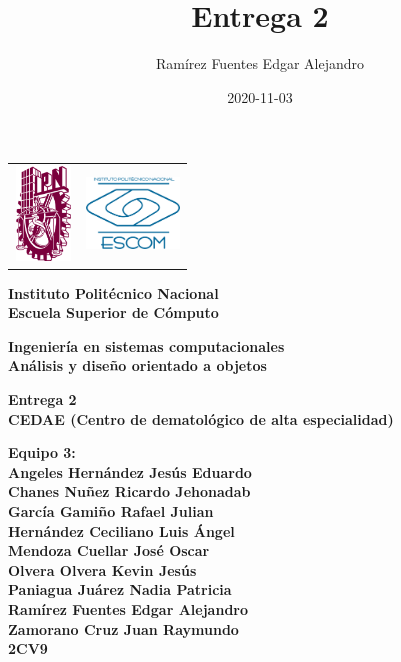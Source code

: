 \documentclass[12pt,letterpaper]{article}
\author{Ram\'irez Fuentes Edgar Alejandro}
\title{Entrega 2}
\date {2020-11-03}
\begin{document}
	\pagestyle{plain}
	{

		{
			\begin{tabular}
				{
					p{} 
					p{} 
				}
				\includegraphics[width=1.5cm, height=2.5cm]{ipn.png} &  
				\includegraphics[width=2.5cm, height=2cm]{escom.png}
			\end{tabular}
		}

		\begin{center}

			\par\vspace{1cm} %
			{
				\Huge\textbf
				{
					Instituto Polit\'ecnico Nacional 
					\\[.2cm]Escuela Superior de C\'omputo
				}
			}

			\par\vspace{0.5cm}
			{
				\Large\textbf
				{
					Ingenier\'ia en sistemas computacionales 
					\\[.5cm]An\'alisis y diseño orientado a objetos
				}
			}

			\vfill

			\par\vspace{0.5cm}
			{
				\Large\textbf
				{
					Entrega 2 \\
					CEDAE (Centro de dematológico de alta especialidad)
				}
			}

			\vfill

			\par\vspace{1cm}
			{
				\large\textbf
				{
                    Equipo 3:
                    \\Angeles Hernández Jesús Eduardo
                    \\Chanes Nuñez Ricardo Jehonadab
                    \\García Gamiño Rafael Julian
                    \\Hernández Ceciliano Luis Ángel
                    \\Mendoza Cuellar José Oscar
                    \\Olvera Olvera Kevin Jesús
                    \\Paniagua Juárez Nadia Patricia
                    \\Ramírez Fuentes Edgar Alejandro
                    \\Zamorano Cruz Juan Raymundo
					\\2CV9
				} 
			}


\end{center}}
\end{document}
